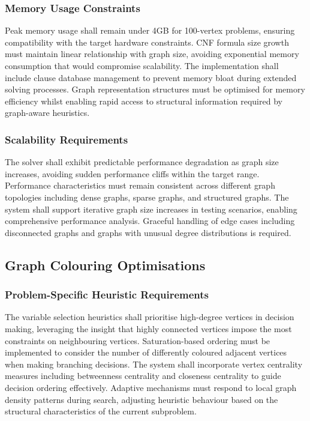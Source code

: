 \subsubsection{Memory Usage Constraints}
Peak memory usage shall remain under 4GB for 100-vertex problems, ensuring compatibility with the target hardware constraints. CNF formula size growth must maintain linear relationship with graph size, avoiding exponential memory consumption that would compromise scalability. The implementation shall include clause database management to prevent memory bloat during extended solving processes. Graph representation structures must be optimised for memory efficiency whilst enabling rapid access to structural information required by graph-aware heuristics.

\subsubsection{Scalability Requirements}
The solver shall exhibit predictable performance degradation as graph size increases, avoiding sudden performance cliffs within the target range. Performance characteristics must remain consistent across different graph topologies including dense graphs, sparse graphs, and structured graphs. The system shall support iterative graph size increases in testing scenarios, enabling comprehensive performance analysis. Graceful handling of edge cases including disconnected graphs and graphs with unusual degree distributions is required.

\subsection{Graph Colouring Optimisations}

\subsubsection{Problem-Specific Heuristic Requirements}
The variable selection heuristics shall prioritise high-degree vertices in decision making, leveraging the insight that highly connected vertices impose the most constraints on neighbouring vertices. Saturation-based ordering must be implemented to consider the number of differently coloured adjacent vertices when making branching decisions. The system shall incorporate vertex centrality measures including betweenness centrality and closeness centrality to guide decision ordering effectively. Adaptive mechanisms must respond to local graph density patterns during search, adjusting heuristic behaviour based on the structural characteristics of the current subproblem.

